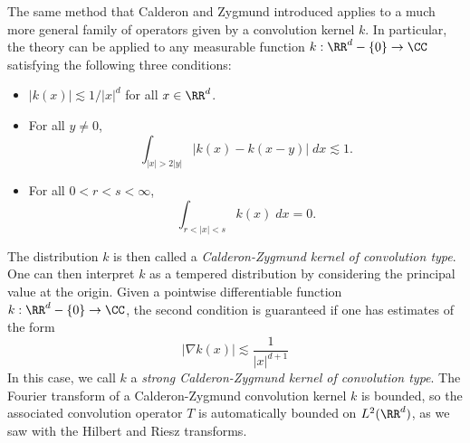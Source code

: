 The same method that Calderon and Zygmund introduced applies to a much more general family of operators given by a convolution kernel $k$. In particular, the theory can be applied to any measurable function $k: \RR^d - \{ 0 \} \to \CC$ satisfying the following three conditions:
%
\begin{itemize}
    \item $|k(x)| \lesssim 1/|x|^d$ for all $x \in \RR^d$.

    \item For all $y \neq 0$,
    \[ \int_{|x| > 2 |y|} |k(x) - k(x - y)|\; dx \lesssim 1. \]

    \item For all $0 < r < s < \infty$,
    \[ \int_{r < |x| < s} k(x)\; dx = 0. \]
\end{itemize}
%
The distribution $k$ is then called a \emph{Calderon-Zygmund kernel of convolution type}. One can then interpret $k$ as a tempered distribution by considering the principal value at the origin. Given a pointwise differentiable function $k: \RR^d - \{ 0 \} \to \CC$, the second condition is guaranteed if one has estimates of the form
%
\[ | \nabla k(x) | \lesssim \frac{1}{|x|^{d+1}} \]
%
In this case, we call $k$ a \emph{strong Calderon-Zygmund kernel of convolution type}. The Fourier transform of a Calderon-Zygmund convolution kernel $k$ is bounded, so the associated convolution operator $T$ is automatically bounded on $L^2(\RR^d)$, as we saw with the Hilbert and Riesz transforms.

